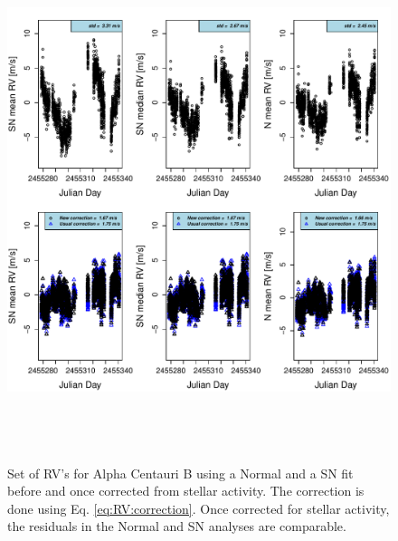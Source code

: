 \documentclass{aa}
\begin{document}
\begin{figure} 
\begin{center}
\includegraphics[height = 6in]{NEW_CORRECTIONHD12862_[3]CorrectionActivity_RadialVelocity_vs_time.pdf} 
   \caption{Set of RV's for Alpha Centauri B using a Normal and a SN fit before and once corrected from stellar activity. The correction is done using Eq. \ref{eq:RV:correction}. Once corrected for stellar activity, the residuals in the Normal and SN analyses are comparable.}
   \label{fig:alphacent:correctionRV}
\end{center}
\end{figure}
\end{document}
